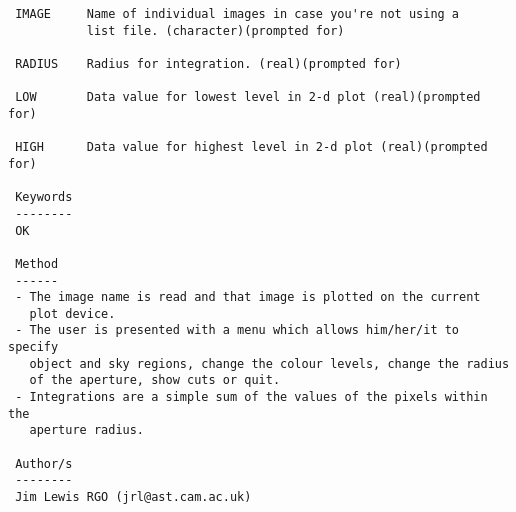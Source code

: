 \begin{description}
\begin{verbatim}
 IMAGE     Name of individual images in case you're not using a
           list file. (character)(prompted for)

 RADIUS    Radius for integration. (real)(prompted for)

 LOW       Data value for lowest level in 2-d plot (real)(prompted for)

 HIGH      Data value for highest level in 2-d plot (real)(prompted for)

 Keywords
 --------
 OK

 Method
 ------
 - The image name is read and that image is plotted on the current
   plot device.
 - The user is presented with a menu which allows him/her/it to specify
   object and sky regions, change the colour levels, change the radius
   of the aperture, show cuts or quit.
 - Integrations are a simple sum of the values of the pixels within the
   aperture radius.

 Author/s
 --------
 Jim Lewis RGO (jrl@ast.cam.ac.uk)
\end{verbatim}
\end{description}
